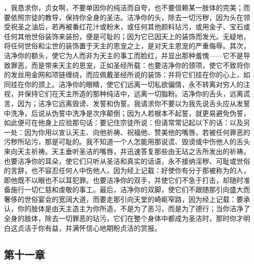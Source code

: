 ，我恳求你，贞女啊，不要单因你的纯洁而自夸，也不要信赖某一肢体的完美；而要依照宗徒的教导，保持你全身的圣洁。洁净你的头，除去一切污秽，因为头在领受祝圣之油后，若再被番红花汁或粉末，或任何其他颜料玷污，或用金子、宝石或任何其他世俗装饰来装扮，便是可耻的；因为它已因天上的装饰而发光。无疑地，将任何世俗和尘世的装饰置于天主的恩宠之上，是对天主恩宠的严重侮辱。其次，洁净你的额头，使它为人而非为天主的事工而脸红，并显出那种羞愧——它不是导致罪恶，而是带来天主的恩宠，正如圣经所载：也要洁净你的颈项，使它不致将你的发丝用金网和项链缠绕，而应佩戴圣经所说的装饰：并将它们挂在你的心上，如同挂在你的颈上。洁净你的眼睛，使它们远离一切私欲偏情，永不转离对穷人的注视，并保持它们在天主所造的那种纯洁中，远离一切脂粉。洁净你的舌头，远离谎言，因为；洁净它远离毁谤、发誓和伪誓。我请求你不要以为我先说舌头应从发誓中洗净，后说从伪誓中洗净是次序颠倒；因为人若根本不起誓，就更易避免伪誓，如此便可在他身上应验那句话：要记住宗徒所说：但请常常记起以下的话：以及另一处：因为你用以宣认天主、向他祈祷、祝福他、赞美他的嘴唇，若被任何罪恶的污秽所玷污，那是可耻的。我不知道一个人怎能用那说谎、毁谤或中伤他人的舌头来向天主祈祷。天主垂听圣洁的嘴唇，并迅速答复那些由无玷之舌所发出的祈祷。也要洁净你的耳朵，使它们只听从圣洁和真实的话语，永不接纳淫秽、可耻或世俗的言辞，也不容忍任何人中伤他人，因为经上记载：好使你有分于那被称为的人，即他既不以眼也不以耳犯罪。也要洁净你的双手，并使它们不急于打击，却随时准备施行一切仁慈和虔敬的事工。最后，洁净你的双脚，使它们不跟随那引向盛大而奢侈的世俗宴会的宽阔大道，而要走那引向天堂的崎岖窄路，因为经上记载：要承认，你的肢体是由天主造主为你所造，不是为了恶习，而是为了德行；当你洁净了全身的肢体，除去一切罪恶的玷污，它们在整个身体中都成为圣洁时，那时你才明白这贞洁于你有益，并满怀信心地期盼贞洁的赏报。\par


\subsection{第十一章}

